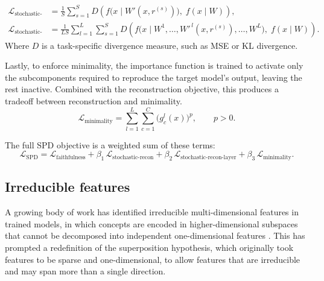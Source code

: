 \documentclass{article}
\begin{document}
\begin{equation}
\begin{aligned}
    \mathcal{L}_{\text{stochastic-recon}}
      &= \frac{1}{S} \sum_{s=1}^{S}
         D\!\left(f\bigl(x \mid W'(x, r^{(s)})\bigr),\; f(x \mid W)\right), \\
    \mathcal{L}_{\text{stochastic-recon-layer}}
      &= \frac{1}{LS} \sum_{l=1}^{L} \sum_{s=1}^{S}
         D\!\left(f\bigl(x \mid W^{1}, \dots, W'^{\,l}(x, r^{(s)}), \dots, W^{L}\bigr),\;
                  f(x \mid W)\right).
\end{aligned}
\end{equation}
Where $D$ is a task-specific divergence measure, such as MSE or KL divergence.

Lastly, to enforce minimality, the importance function
is trained to activate only the subcomponents
required to reproduce the target model's output,
leaving the rest inactive.
Combined with the reconstruction objective,
this produces a tradeoff between reconstruction and minimality.
\begin{equation}
    \mathcal{L}_{\text{minimality}}
      = \sum_{l=1}^{L} \sum_{c=1}^{C} \bigl(g^{l}_{c}(x)\bigr)^{p},
      \qquad p > 0.
\end{equation}
\label{spd_minimality}

The full SPD objective is a weighted sum of these terms:
\begin{equation}
    \mathcal{L}_{\text{SPD}}
      = \mathcal{L}_{\text{faithfulness}}
      + \beta_{1}\, \mathcal{L}_{\text{stochastic-recon}}
      + \beta_{2}\, \mathcal{L}_{\text{stochastic-recon-layer}}
      + \beta_{3}\, \mathcal{L}_{\text{minimality}}.
\end{equation}


\subsection{Irreducible features}
\label{sec:irreducibility}
A growing body of work has identified irreducible
multi-dimensional features in trained models,
in which concepts are encoded in higher-dimensional
subspaces that cannot be decomposed into independent
one-dimensional features
\autocite{engels2025languagemodelfeaturesonedimensionally}.
This has prompted a redefinition of the superposition
hypothesis, which originally took features to be sparse
and one-dimensional, to allow features that are
irreducible and may span more than a single direction.
\end{document}
